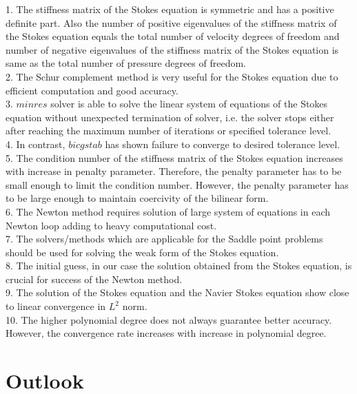 \documentclass[a4paper,openany]{book}
\begin{document}
1. The stiffness matrix of the Stokes equation is symmetric and has a positive definite part. Also the number of positive eigenvalues of the stiffness matrix of the Stokes equation equals the total number of velocity degrees of freedom and number of negative eigenvalues of the stiffness matrix of the Stokes equation is same as the total number of pressure degrees of freedom.\\

2. The Schur complement method is very useful for the Stokes equation due to efficient computation and good accuracy. \\

3. $minres$ solver is able to solve the linear system of equations of the Stokes equation without unexpected termination of solver, i.e. the solver stops either after reaching the maximum number of iterations or specified tolerance level.\\

4. In contrast, $bicgstab$ has shown failure to converge to desired tolerance level.\\

5. The condition number of the stiffness matrix of the Stokes equation increases with increase in penalty parameter. Therefore, the penalty parameter has to be small enough to limit the condition number. However, the penalty parameter has to be large enough to maintain coercivity of the bilinear form. \\

6. The Newton method requires solution of large system of equations in each Newton loop adding to heavy computational cost.\\

7. The solvers/methods which are applicable for the Saddle point problems should be used for solving the weak form of the Stokes equation.\\

8. The initial guess, in our case the solution obtained from the Stokes equation, is crucial for success of the Newton method.\\

9. The solution of the Stokes equation and the Navier Stokes equation show close to linear convergence in $L^2$ norm.\\

10. The higher polynomial degree does not always guarantee better accuracy. However, the convergence rate increases with increase in polynomial degree.

\section{Outlook}
\end{document}
